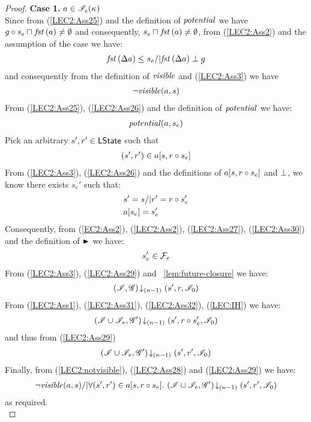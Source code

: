 \begin{lemma}
\begin{proof}
\noindent\textbf{Case 1. }$a \in \mathscr{I}_e(\kappa_{})$\\
Since from (\ref{LEC2:Ass25}) and the definition of $\mathit{potential}$ we have $g \circ s_e \sqcap_{} \mathit{fst}\left(a\right) \not= \emptyset$ and consequently, $s_e \sqcap_{} \mathit{fst}\left(a\right) \not= \emptyset$, from (\ref{LEC2:Ass2}) and the assumption of the case we have:
%
\begin{align}
	\mathit{fst}\left(\Delta {a}\right) \leq s_e /| \mathit{fst}\left(\Delta {a}\right) \mathrel{\bot} g \label{LEC2:Ass26}
\end{align}
% 
and consequently from the definition of $\mathit{visible}$ and (\ref{LEC2:Ass3}) we have
%
\begin{align}
	\neg\mathit{visible}(a, s)
	\label{LEC2:notvisible}
\end{align}
%
From (\ref{LEC2:Ass25}), (\ref{LEC2:Ass26}) and the definition of $\mathit{potential}$ we have:
%
\begin{align}
	\mathit{potential}(a, s_e) \label{LEC2:Ass27}
\end{align}
%
Pick an arbitrary $s', r' \in \textsf{LState}$ such that
%
\begin{align}
	(s', r') \in a[s, r \circ s_e]
	\label{LEC2:Ass28}
\end{align}
%
From (\ref{LEC2:Ass3}), (\ref{LEC2:Ass26}) and the definitions of $a[s, r \circ s_e]$ and $\mathrel{\bot}$, we know there exists $s_e'$ such that: 
%
\begin{align}
	& s' = s /| r' = r \circ s_e' \label{LEC2:Ass29}\\
	& a[s_e] = s_e'  \label{LEC2:Ass30}
\end{align}
%
Consequently, from (\ref{EC2:Ass2}), (\ref{LEC2:Ass2}), (\ref{LEC2:Ass27}), (\ref{LEC2:Ass30}) and the definition of $\strictfences$ we have:
%
\begin{align}
	s_e' \in \mathcal{F}_{e}  \label{LEC2:Ass31}
\end{align}
%
From (\ref{LEC2:Ass3}), (\ref{LEC2:Ass29}) and \lem~\ref{lem:future-closure} we have:
%
\begin{align}
	\left(\mathscr{I}, \mathscr{G}\right) \!\downarrow_{(n-1)} \left(s', r, \mathscr{I}_0\right)  \label{LEC2:Ass32}
\end{align}
%
From (\ref{LEC2:Ass1}), (\ref{LEC2:Ass31}), (\ref{LEC2:Ass32}), (\ref{LEC:IH}) we have:
%
\begin{align*}
	\left(\mathscr{I} \cup \mathscr{I}_{e}, \mathscr{G}'\right) \!\downarrow_{(n-1)} \left(s', r \circ s_e', \mathscr{I}_0\right)
\end{align*}
%
and thus from (\ref{LEC2:Ass29}) 
%
\begin{align}
	\left(\mathscr{I} \cup \mathscr{I}_{e}, \mathscr{G}'\right) \!\downarrow_{(n-1)} \left(s', r', \mathscr{I}_0\right)
	\label{LEC2:Ass33}
\end{align}
%
Finally, from (\ref{LEC2:notvisible}), (\ref{LEC2:Ass28}) and (\ref{LEC2:Ass29}) we have:
%
\begin{align*}
	\neg\mathit{visible}(a, s) /| \forall (s', r') \in a[s, r \circ s_e].\, \left(\mathscr{I} \cup \mathscr{I}_{e}, \mathscr{G}'\right) \!\downarrow_{(n-1)} \left(s', r', \mathscr{I}_0\right)
\end{align*}
%
as required.\\


\end{proof}
\end{lemma}
